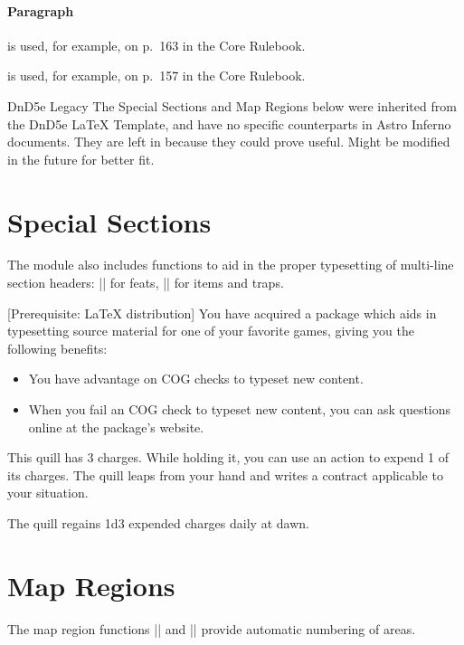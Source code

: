 \documentclass[letterpaper,twocolumn,openany,nodeprecatedcode]{astroinfernobook}
\begin{document}
\paragraph{Paragraph}
is used, for example, on p.~163 in the Core Rulebook.

is used, for example, on p.~157 in the Core Rulebook.

\begin{AIComment}{DnD5e Legacy}
The Special Sections and Map Regions below were inherited from the DnD5e \LaTeX{} Template, and have
no specific counterparts in Astro Inferno documents. They are left in because
they could prove useful. Might be modified in the future for better fit.
\end{AIComment}

\section{Special Sections}
The module also includes functions to aid in the proper typesetting of multi-line section headers: |\AIFeatHeader| for feats, |\AIItemHeader| for items and traps.

[Prerequisite: \LaTeX{} distribution]
You have acquired a package which aids in typesetting source material for one of your favorite games, giving you the following benefits:

\begin{itemize}
  \item You have advantage on COG checks to typeset new content.
  \item When you fail an COG check to typeset new content, you can ask questions online at the package's website.
\end{itemize}

\newpage %

This quill has 3 charges. While holding it, you can use an action to expend 1 of its charges. The quill leaps from your hand and writes a contract applicable to your situation.

The quill regains 1d3 expended charges daily at dawn.

\section{Map Regions}
The map region functions |\AIArea| and |\AISubArea| provide automatic numbering of areas.
\end{document}
